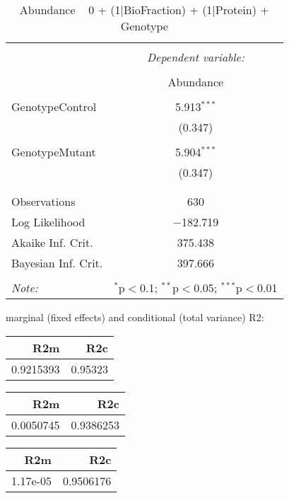 \documentclass[11pt]{report}
\begin{document}
\begin{table}[!htbp] \centering 
  \caption{Abundance ~ 0 + (1|BioFraction) + (1|Protein) + Genotype} 
  \label{} 
\begin{tabular}{@{\extracolsep{5pt}}lc} 
\\[-1.8ex]\hline 
\hline \\[-1.8ex] 
 & \multicolumn{1}{c}{\textit{Dependent variable:}} \\ 
\cline{2-2} 
\\[-1.8ex] & Abundance \\ 
\hline \\[-1.8ex] 
 GenotypeControl & 5.913$^{***}$ \\ 
  & (0.347) \\ 
  & \\ 
 GenotypeMutant & 5.904$^{***}$ \\ 
  & (0.347) \\ 
  & \\ 
\hline \\[-1.8ex] 
Observations & 630 \\ 
Log Likelihood & $-$182.719 \\ 
Akaike Inf. Crit. & 375.438 \\ 
Bayesian Inf. Crit. & 397.666 \\ 
\hline 
\hline \\[-1.8ex] 
\textit{Note:}  & \multicolumn{1}{r}{$^{*}$p$<$0.1; $^{**}$p$<$0.05; $^{***}$p$<$0.01} \\ 
\end{tabular} 
\end{table} 
marginal (fixed effects) and conditional (total variance) R2:

\begin{tabular}{r|r}
\hline
R2m & R2c\\
\hline
0.9215393 & 0.95323\\
\hline
\end{tabular}

\begin{tabular}{r|r}
\hline
R2m & R2c\\
\hline
0.0050745 & 0.9386253\\
\hline
\end{tabular}

\begin{tabular}{r|r}
\hline
R2m & R2c\\
\hline
1.17e-05 & 0.9506176\\
\hline
\end{tabular}
\end{document}
